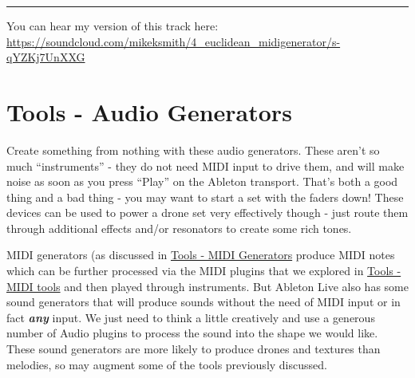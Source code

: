 \documentclass[
  12pt,
  letterpaper,
  oneside,
  open=any]{scrbook}
\begin{document}
\begin{center}\rule{0.5\linewidth}{0.5pt}\end{center}

You can hear my version of this track here:
\href{https://soundcloud.com/mikeksmith/4_euclidean_midigenerator/s-qYZKj7UnXXG?in=mikeksmith/sets/the-lazy-producer-recipes/s-PGMEWqfwKGz&si=6b1ee90238dd4a3c9fe75f66fd1f6623&utm_source=clipboard&utm_medium=text&utm_campaign=social_sharing}{https://soundcloud.com/mikeksmith/4\_euclidean\_midigenerator/s-qYZKj7UnXXG}


\chapter{Tools - Audio
Generators}\label{Chapter-014-Tools-Audio_Generators}

Create something from nothing with these audio generators. These aren't
so much ``instruments'' - they do not need MIDI input to drive them, and
will make noise as soon as you press ``Play'' on the Ableton transport.
That's both a good thing and a bad thing - you may want to start a set
with the faders down! These devices can be used to power a drone set
very effectively though - just route them through additional effects
and/or resonators to create some rich tones.

\begin{tcolorbox}[enhanced jigsaw, opacitybacktitle=0.6, rightrule=.15mm, leftrule=.75mm, opacityback=0, toptitle=1mm, toprule=.15mm, breakable, titlerule=0mm, colback=white, bottomtitle=1mm, title=\textcolor{quarto-callout-tip-color}{\faLightbulb}\hspace{0.5em}{Key idea}, coltitle=black, left=2mm, colframe=quarto-callout-tip-color-frame, bottomrule=.15mm, colbacktitle=quarto-callout-tip-color!10!white, arc=.35mm]

MIDI generators (as discussed in
\hyperref[Chapter-012-Tools-MIDI_Generators]{Tools - MIDI Generators}
produce MIDI notes which can be further processed via the MIDI plugins
that we explored in \hyperref[Chapter-004-Tools-MIDI_tools]{Tools - MIDI
tools} and then played through instruments. But Ableton Live also has
some sound generators that will produce sounds without the need of MIDI
input or in fact \textbf{\emph{any}} input. We just need to think a
little creatively and use a generous number of Audio plugins to process
the sound into the shape we would like. These sound generators are more
likely to produce drones and textures than melodies, so may augment some
of the tools previously discussed.

\end{tcolorbox}
\end{document}
